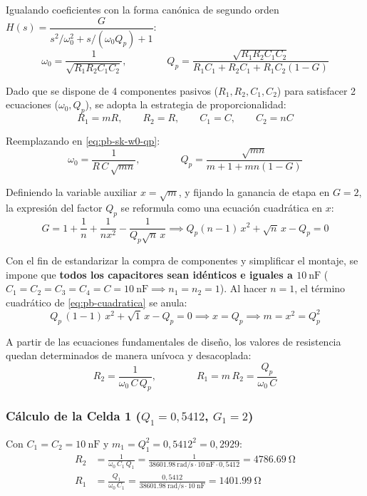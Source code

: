 Igualando coeficientes con la forma canónica de segundo orden
$H(s) = \dfrac{G}{s^2/\omega_0^2 + s/(\omega_0 Q_p) + 1}$:
\begin{equation}
  \omega_0 = \frac{1}{\sqrt{R_1 R_2 C_1 C_2}}, \qquad\qquad
  Q_p = \frac{\sqrt{R_1 R_2 C_1 C_2}}{R_1 C_1 + R_2 C_1 + R_1 C_2 (1 - G)}
  \label{eq:pb-sk-w0-qp}
\end{equation}

Dado que se dispone de 4 componentes pasivos ($R_1, R_2, C_1, C_2$) para satisfacer 2 ecuaciones ($\omega_0, Q_p$),
se adopta la estrategia de proporcionalidad:
\begin{equation}
  R_1 = m R, \qquad R_2 = R, \qquad C_1 = C, \qquad C_2 = n C
\end{equation}

Reemplazando en \eqref{eq:pb-sk-w0-qp}:
\begin{equation}
  \omega_0 = \frac{1}{R\,C\,\sqrt{m n}}, \qquad\qquad Q_p = \frac{\sqrt{m n}}{m + 1 + m n (1 - G)}
  \label{eq:pb-sk-prop}
\end{equation}

Definiendo la variable auxiliar $x = \sqrt{m}$, y fijando la ganancia de etapa en $G = 2$, la expresión del factor
$Q_p$ se reformula como una ecuación cuadrática en $x$:
\begin{equation}
  G = 1 + \frac{1}{n} + \frac{1}{n x^2} - \frac{1}{Q_p \sqrt{n}\,x} \implies Q_p (n - 1)\,x^2 + \sqrt{n}\,x - Q_p = 0
  \label{eq:pb-cuadratica}
\end{equation}

Con el fin de estandarizar la compra de componentes y simplificar el montaje, se impone que \textbf{todos los capacitores sean idénticos e iguales a $\SI{10}{\nano\farad}$} ($C_1 = C_2 = C_3 = C_4 = C = \SI{10}{\nano\farad} \implies n_1 = n_2 = 1$). Al hacer $n = 1$, el término cuadrático de \eqref{eq:pb-cuadratica} se anula:
\begin{equation}
  Q_p\,(1 - 1)\,x^2 + \sqrt{1}\,x - Q_p = 0 \implies x = Q_p \implies m = x^2 = Q_p^2
\end{equation}

A partir de las ecuaciones fundamentales de diseño, los valores de resistencia quedan determinados de manera unívoca y desacoplada:
\begin{equation}
  R_2 = \frac{1}{\omega_0\,C\,Q_p}, \qquad\qquad R_1 = m\,R_2 = \frac{Q_p}{\omega_0\,C}
\end{equation}

\subsubsection{Cálculo de la Celda 1 ($Q_1 = 0{,}5412$, $G_1 = 2$)}
Con $C_1 = C_2 = \SI{10}{\nano\farad}$ y $m_1 = Q_1^2 = 0{,}5412^2 = 0{,}2929$:
\begin{align}
  R_2 &= \frac{1}{\omega_0\,C_1\,Q_1} = \frac{1}{\SI{38601.98}{\radian/\second} \cdot \SI{10}{\nano\farad} \cdot 0{,}5412} = \SI{4786.69}{\ohm} \\
  R_1 &= \frac{Q_1}{\omega_0\,C_1} = \frac{0{,}5412}{\SI{38601.98}{\radian/\second} \cdot \SI{10}{\nano\farad}} = \SI{1401.99}{\ohm}
\end{align}

